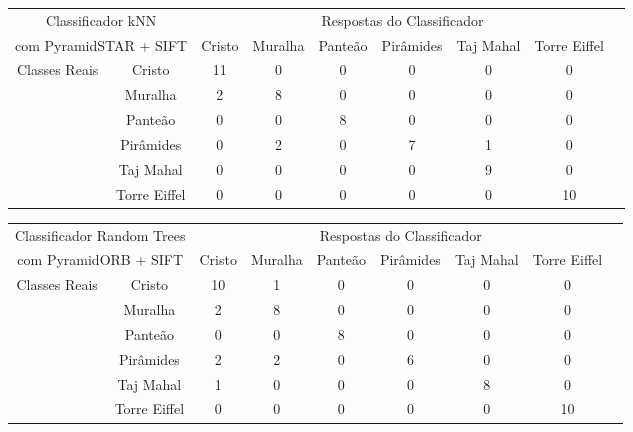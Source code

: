 \documentclass[a4paper,11pt]{article}
\begin{document}
  \hspace{-75pt}
  \begin{tabular}{|cc|c|c|c|c|c|c|c|}
    \hline
    \multicolumn{2}{|c|}{Classificador kNN} &
    \multicolumn{6}{|c|}{Respostas do Classificador} \\
    \cline{3-8}
    \multicolumn{2}{|c|}{com PyramidSTAR + SIFT}
    & Cristo & Muralha & Panteão & Pirâmides & Taj Mahal & Torre Eiffel \\
    \hline
    \multirow{6}{*}{Classes Reais}
    & \multicolumn{1}{|c|}{Cristo} & 11 & 0 & 0 & 0 & 0 & 0 \\
    \cline{2-8}
    & \multicolumn{1}{|c|}{Muralha} & 2 & 8 & 0 & 0 & 0 & 0\\
    \cline{2-8}
    & \multicolumn{1}{|c|}{Panteão} & 0 & 0 & 8 & 0 & 0 & 0\\
    \cline{2-8}
    & \multicolumn{1}{|c|}{Pirâmides} & 0 & 2 & 0 & 7 & 1 & 0\\
    \cline{2-8}
    & \multicolumn{1}{|c|}{Taj Mahal} & 0 & 0 & 0 & 0 & 9 & 0\\
    \cline{2-8}
    & \multicolumn{1}{|c|}{Torre Eiffel} & 0 & 0 & 0 & 0 & 0 & 10\\
    \hline
  \end{tabular}
  \bigskip


  \hspace{-75pt}
  \begin{tabular}{|cc|c|c|c|c|c|c|c|}
    \hline
    \multicolumn{2}{|c|}{Classificador Random Trees} &
    \multicolumn{6}{|c|}{Respostas do Classificador} \\
    \cline{3-8}
    \multicolumn{2}{|c|}{com PyramidORB + SIFT}
    & Cristo & Muralha & Panteão & Pirâmides & Taj Mahal & Torre Eiffel \\
    \hline
    \multirow{6}{*}{Classes Reais}
    & \multicolumn{1}{|c|}{Cristo} & 10 & 1 & 0 & 0 & 0 & 0 \\
    \cline{2-8}
    & \multicolumn{1}{|c|}{Muralha} & 2 & 8 & 0 & 0 & 0 & 0\\
    \cline{2-8}
    & \multicolumn{1}{|c|}{Panteão} & 0 & 0 & 8 & 0 & 0 & 0\\
    \cline{2-8}
    & \multicolumn{1}{|c|}{Pirâmides} & 2 & 2 & 0 & 6 & 0 & 0\\
    \cline{2-8}
    & \multicolumn{1}{|c|}{Taj Mahal} & 1 & 0 & 0 & 0 & 8 & 0\\
    \cline{2-8}
    & \multicolumn{1}{|c|}{Torre Eiffel} & 0 & 0 & 0 & 0 & 0 & 10\\
    \hline
  \end{tabular}
  \bigskip
\end{document}
